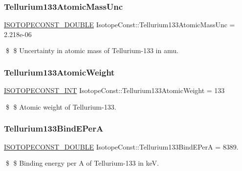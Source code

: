 \subsubsection{\texorpdfstring{Tellurium133\+Atomic\+Mass\+Unc}{Tellurium133AtomicMassUnc}}
{\footnotesize\ttfamily \mbox{\hyperlink{group___isotope_const-_macros_ga8f45a7272ce02c0b4c65c44636ed719a}{I\+S\+O\+T\+O\+P\+E\+C\+O\+N\+S\+T\+\_\+\+D\+O\+U\+B\+LE}} Isotope\+Const\+::\+Tellurium133\+Atomic\+Mass\+Unc = 2.\+218e-\/06}

\$ \$ Uncertainty in atomic mass of Tellurium-\/133 in amu. \mbox{\label{group___isotope_const-_tellurium-_te133_ga0b5265c8fab504d1db5ed8142dfbd131}} 
\subsubsection{\texorpdfstring{Tellurium133\+Atomic\+Weight}{Tellurium133AtomicWeight}}
{\footnotesize\ttfamily \mbox{\hyperlink{group___isotope_const-_macros_ga5f18360b3e99483a35c32d789e62621c}{I\+S\+O\+T\+O\+P\+E\+C\+O\+N\+S\+T\+\_\+\+I\+NT}} Isotope\+Const\+::\+Tellurium133\+Atomic\+Weight = 133}

\$ \$ Atomic weight of Tellurium-\/133. \mbox{\label{group___isotope_const-_tellurium-_te133_ga1319d3938239e64d0f6cd4b3fe7f71c8}} 
\subsubsection{\texorpdfstring{Tellurium133\+Bind\+E\+PerA}{Tellurium133BindEPerA}}
{\footnotesize\ttfamily \mbox{\hyperlink{group___isotope_const-_macros_ga8f45a7272ce02c0b4c65c44636ed719a}{I\+S\+O\+T\+O\+P\+E\+C\+O\+N\+S\+T\+\_\+\+D\+O\+U\+B\+LE}} Isotope\+Const\+::\+Tellurium133\+Bind\+E\+PerA = 8389.}

\$ \$ Binding energy per A of Tellurium-\/133 in keV. \mbox{\label{group___isotope_const-_tellurium-_te133_gad67306b24e370d2774eec1cd8fb1f1e2}} 

